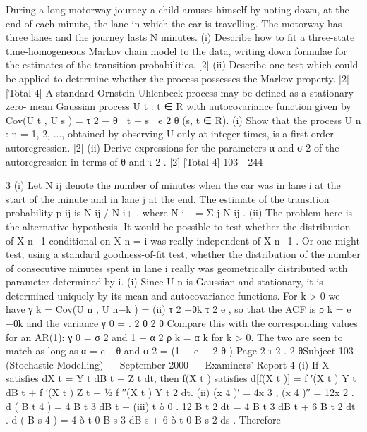 \documentclass[a4paper,12pt]{article}
\begin{document}
During a long motorway journey a child amuses himself by noting down, at the
end of each minute, the lane in which the car is travelling. The motorway has
three lanes and the journey lasts N minutes.
(i) Describe how to fit a three-state time-homogeneous Markov chain model
to the data, writing down formulae for the estimates of the transition
probabilities.
[2]
(ii) Describe one test which could be applied to determine whether the process
possesses the Markov property. [2]
[Total 4]
A standard Ornstein-Uhlenbeck process may be defined as a stationary zero-
mean Gaussian process {U t : t ∈ R} with autocovariance function given by
Cov(U t , U s ) =
τ 2 − θ  t − s 
e
2 θ
(s, t ∈ R).
(i) Show that the process {U n : n = 1, 2, ...}, obtained by observing U only at
integer times, is a first-order autoregression.
[2]
(ii) Derive expressions for the parameters α and σ 2 of the autoregression in
terms of θ and τ 2 .
[2]
[Total 4]
103—244

3
(i) Let N ij denote the number of minutes when the car was in lane i at the
start of the minute and in lane j at the end. The estimate of the
transition probability p ij is N ij / N i+ , where N i+ = Σ j N ij .
(ii) The problem here is the alternative hypothesis. It would be possible to
test whether the distribution of X n+1 conditional on X n = i was really
independent of X n−1 . Or one might test, using a standard goodness-of-fit
test, whether the distribution of the number of consecutive minutes spent
in lane i really was geometrically distributed with parameter determined
by i.
(i) Since {U n } is Gaussian and stationary, it is determined uniquely by its
mean and autocovariance functions. For k > 0 we have γ k = Cov(U n , U n−k )
=
(ii)
τ 2 −θk
τ 2
e , so that the ACF is ρ k = e −θk and the variance γ 0 =
.
2 θ
2 θ
Compare this with the corresponding values for an AR(1): γ 0 =
σ 2
and
1 − α 2
ρ k = α k for k > 0.
The two are seen to match as long as α = e −θ and σ 2 = (1 − e − 2 θ )
Page 2
τ 2
.
2 θSubject 103 (Stochastic Modelling) — September 2000 — Examiners’ Report
4
(i)
If X satisfies dX t = Y t dB t + Z t dt, then f(X t ) satisfies
d[f(X t )] = f ′(X t ) Y t dB t + { f ′(X t ) Z t + 1⁄2 f ′′(X t ) Y t 2 } dt.
(ii)
(x 4 )′ = 4x 3 , (x 4 )′′ = 12x 2 .
d ( B t 4 ) = 4 B t 3 dB t +
(iii)
t
ò 0
. 12 B t 2 dt = 4 B t 3 dB t + 6 B t 2 dt .
d ( B s 4 ) = 4 ò t 0 B s 3 dB s + 6 ò t 0 B s 2 ds .
Therefore
\end{document}
